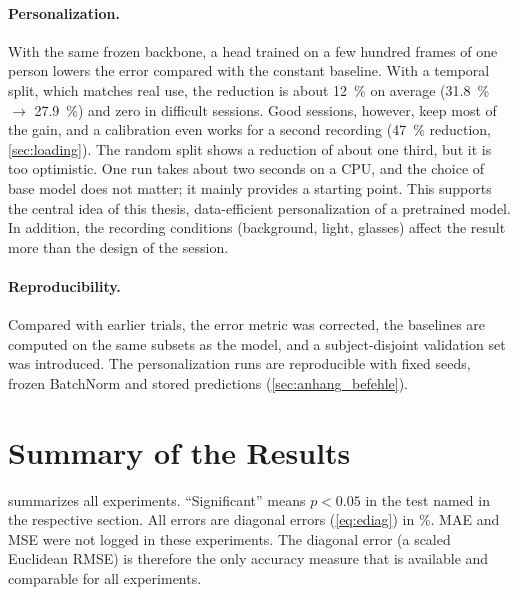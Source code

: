 \paragraph{Personalization.}
With the same frozen backbone, a head trained on a few hundred frames of one
person lowers the error compared with the constant baseline. With a temporal
split, which matches real use, the reduction is about \SI{12}{\percent} on
average (\SI{31.8}{\percent} $\rightarrow$ \SI{27.9}{\percent}) and zero in
difficult sessions. Good sessions, however, keep most of the gain, and a
calibration even works for a second recording (\SI{47}{\percent} reduction,
\cref{sec:loading}). The random split shows a reduction of about one third, but
it is too optimistic. One run takes about two seconds on a CPU, and the choice
of base model does not matter; it mainly provides a starting point. This
supports the central idea of this thesis, data-efficient personalization of a
pretrained model. In addition, the recording conditions (background, light,
glasses) affect the result more than the design of the session.

\paragraph{Reproducibility.} Compared with earlier trials, the error metric
was corrected, the baselines are computed on the same subsets as the model, and
a subject-disjoint validation set was introduced. The personalization runs are
reproducible with fixed seeds, frozen BatchNorm and stored predictions
(\cref{sec:anhang_befehle}).

\section{Summary of the Results}
\label{sec:summary}

 summarizes all experiments. \enquote{Significant} means
$p<0.05$ in the test named in the respective section. All errors are diagonal
errors (\cref{eq:ediag}) in \si{\percent}. MAE and MSE were not logged in these
experiments. The diagonal error (a scaled Euclidean RMSE) is therefore the only
accuracy measure that is available and comparable for all experiments.

